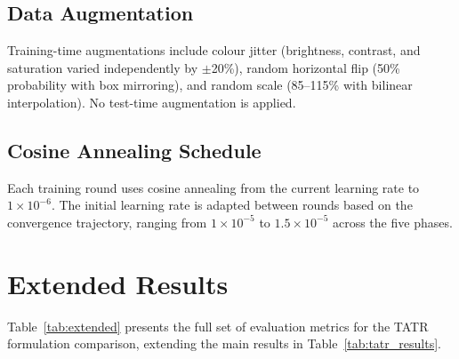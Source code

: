 \documentclass[pdflatex,sn-mathphys-num,iicol]{sn-jnl}
\begin{document}
\begin{appendices}
\subsection*{Data Augmentation}

Training-time augmentations include colour jitter (brightness, contrast, and
saturation varied independently by $\pm$20\%), random horizontal flip (50\%
probability with box mirroring), and random scale (85--115\% with bilinear
interpolation). No test-time augmentation is applied.

\subsection*{Cosine Annealing Schedule}

Each training round uses cosine annealing from the current learning rate to
$1 \times 10^{-6}$. The initial learning rate is adapted between rounds based on
the convergence trajectory, ranging from $1 \times 10^{-5}$ to $1.5 \times 10^{-5}$
across the five phases.


\section{Extended Results}\label{app:extended}

Table~\ref{tab:extended} presents the full set of evaluation metrics for the TATR
formulation comparison, extending the main results in Table~\ref{tab:tatr_results}.


\end{appendices}
\end{document}
